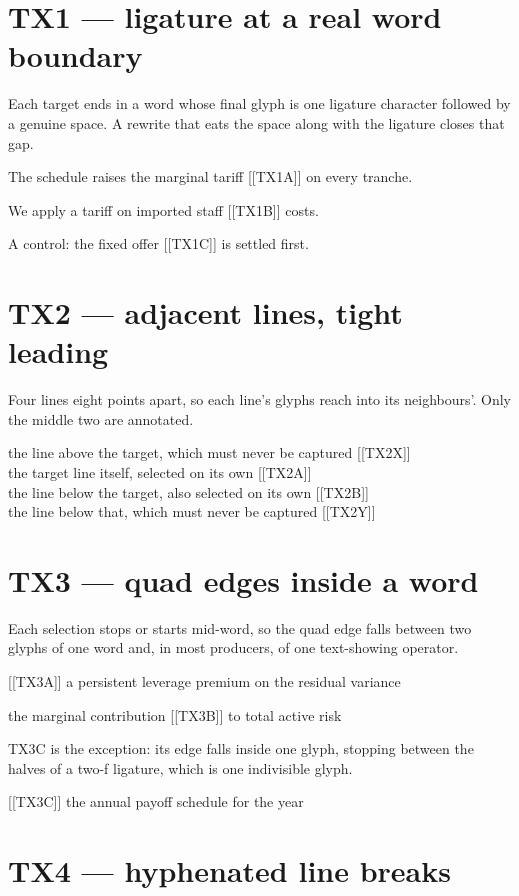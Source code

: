 \documentclass[11pt,a4paper]{article}
\begin{document}
\section*{TX1 --- ligature at a real word boundary}

Each target ends in a word whose final glyph is one ligature character
followed by a genuine space. A rewrite that eats the space along with
the ligature closes that gap.

The schedule raises the marginal tariff [[TX1A]] on every tranche.

We apply a tariff on imported staff [[TX1B]] costs.

A control: the fixed offer [[TX1C]] is settled first.

\section*{TX2 --- adjacent lines, tight leading}

Four lines eight points apart, so each line's glyphs reach into its
neighbours'. Only the middle two are annotated.

\parbox{0.9\textwidth}{\baselineskip=8pt \lineskiplimit=-100pt
\lineskip=0pt \raggedright
the line above the target, which must never be captured [[TX2X]]\\
the target line itself, selected on its own [[TX2A]]\\
the line below the target, also selected on its own [[TX2B]]\\
the line below that, which must never be captured [[TX2Y]]%
}

\section*{TX3 --- quad edges inside a word}

Each selection stops or starts mid-word, so the quad edge falls between
two glyphs of one word and, in most producers, of one text-showing
operator.

[[TX3A]] a persistent leverage premium on the residual variance

the marginal contribution [[TX3B]] to total active risk

TX3C is the exception: its edge falls inside one glyph, stopping
between the halves of a two-f ligature, which is one indivisible glyph.

[[TX3C]] the annual payoff schedule for the year

\section*{TX4 --- hyphenated line breaks}
\end{document}
